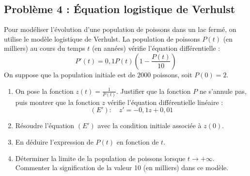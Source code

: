\subsection*{Problème 4 : Équation logistique de Verhulst}
Pour modéliser l'évolution d'une population de poissons dans un lac fermé, on utilise le modèle logistique de Verhulst. La population de poissons $P(t)$ (en milliers) au cours du temps $t$ (en années) vérifie l'équation différentielle :
\[
P'(t) = 0,1 P(t) \left( 1 - \frac{P(t)}{10} \right)
\]
On suppose que la population initiale est de $2000$ poissons, soit $P(0) = 2$.
\begin{enumerate}
    \item On pose la fonction $z(t) = \frac{1}{P(t)}$. Justifier que la fonction $P$ ne s'annule pas, puis montrer que la fonction $z$ vérifie l'équation différentielle linéaire :
    \[
    (E') : \quad z' = -0,1 z + 0,01
    \]
    \item Résoudre l'équation $(E')$ avec la condition initiale associée à $z(0)$.
    \item En déduire l'expression de $P(t)$ en fonction de $t$.
    \item Déterminer la limite de la population de poissons lorsque $t \to +\infty$. Commenter la signification de la valeur 10 (en milliers) dans ce modèle.
\end{enumerate}

